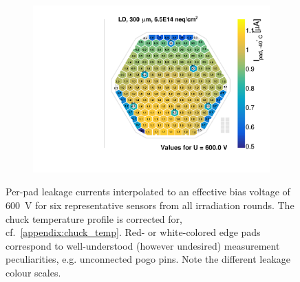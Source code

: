 \begin{figure}
\begin{subfigure}[b]{0.32\textwidth}
		\subcaption{
		}
		\label{plot:iv_hexplot_1013}
	\end{subfigure}
	\hfill
	\begin{subfigure}[b]{0.32\textwidth}
		\includegraphics[width=0.999\textwidth]{plots/iv_hexplots/1002.pdf}
		\subcaption{
		}
		\label{plot:iv_hexplot_1002}
	\end{subfigure}	
	\label{plot:iv_hexplot}
	\caption{
		Per-pad leakage currents interpolated to an effective bias voltage of \SI{600}{\volt} for six representative sensors from all irradiation rounds.
		The chuck temperature profile is corrected for, cf.~\ref{appendix:chuck_temp}.
		Red- or white-colored edge pads correspond to well-understood (however undesired) measurement peculiarities, e.g. unconnected pogo pins.
		Note the different leakage colour scales.
	}
\end{figure}


